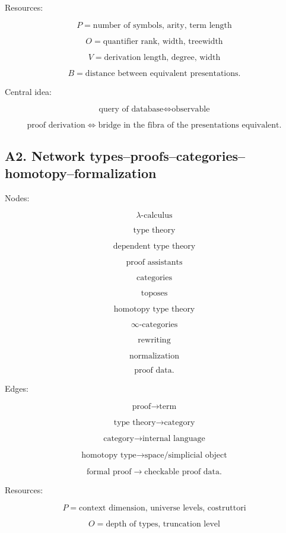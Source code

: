 \documentclass[11pt]{article}
\begin{document}
Resources:

\[
P=\text{number of symbols, arity, term length}
\]

\[
O=\text{quantifier rank, width, treewidth}
\]

\[
V=\text{derivation length, degree, width}
\]

\[
B=\text{distance between equivalent presentations}.
\]

Central idea:

\[
\text{query of database}
\Longleftrightarrow
\text{observable}
\]

\[
\text{proof derivation}
\Longleftrightarrow
\text{bridge in the fibra of the presentations equivalent}.
\]



\subsection{A2. Network types--proofs--categories--homotopy--formalization}

Nodes:

\[
\lambda\text{-calculus}
\]

\[
\text{type theory}
\]

\[
\text{dependent type theory}
\]

\[
\text{proof assistants}
\]

\[
\text{categories}
\]

\[
\text{toposes}
\]

\[
\text{homotopy type theory}
\]

\[
\infty\text{-categories}
\]

\[
\text{rewriting}
\]

\[
\text{normalization}
\]

\[
\text{proof data}.
\]

Edges:

\[
\text{proof}
\to
\text{term}
\]

\[
\text{type theory}
\to
\text{category}
\]

\[
\text{category}
\to
\text{internal language}
\]

\[
\text{homotopy type}
\to
\text{space/simplicial object}
\]

\[
\text{formal proof}
\to
\text{checkable proof data}.
\]

Resources:

\[
P=\text{context dimension, universe levels, costruttori}
\]

\[
O=\text{depth of types, truncation level}
\]
\end{document}
